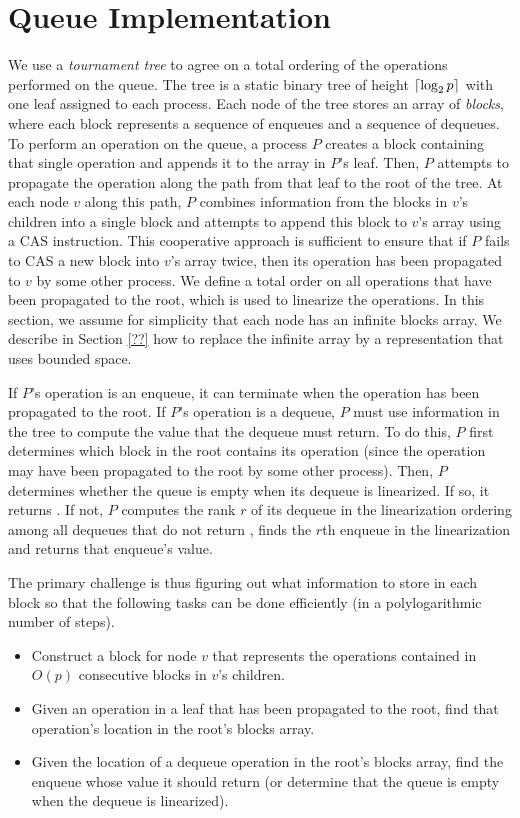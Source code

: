
\section{Queue Implementation} \label{DescriptQ}

We use a \emph{tournament tree} to agree on a total ordering of the operations performed on the queue.
The tree is a static binary tree of height $\lceil \log_2 p \rceil$ with one leaf 
assigned to each process. 
Each node of the tree stores an array of \emph{blocks}, where each block represents a 
sequence of enqueues and a sequence of dequeues.
To perform an operation on the queue, a process $P$ creates a block containing that single 
operation and appends it to the array in $P$'s leaf.
Then, $P$ attempts to propagate the operation along the path from that leaf to the root of the tree.
At each node $v$ along this path, $P$ combines information from the blocks in $v$'s children into a single
block and attempts to append this block to $v$'s array using a CAS instruction.
This cooperative approach is sufficient to ensure that if $P$ fails to CAS a new block into $v$'s array twice,
then its operation has been propagated to $v$ by some other process.
We define a total order on all operations that have been propagated to the root, which is used to
linearize the operations.
In this section, we assume for simplicity that each node has an infinite blocks array.
We describe in Section \ref{??} how to replace the infinite array by a representation that uses bounded space.

If $P$'s operation is an enqueue, it can terminate when the operation has been propagated to the root.
If $P$'s operation is a dequeue, $P$ must use information in the tree to compute the value that the
dequeue must return.  To do this, $P$ first determines which block in the root contains its operation
(since the operation may have been propagated to the root by some other process).
Then, $P$ determines whether the queue is empty when its dequeue is linearized. If so, it returns \nil.
If not, $P$ computes the rank $r$ of its dequeue in the linearization ordering
among all dequeues that do not return \nil,
finds the $r$th enqueue in the linearization and returns that enqueue's value.

The primary challenge is thus figuring out what information to store in each block so that 
the following tasks can be done efficiently (in a polylogarithmic number of steps).
\begin{itemize}
\item
Construct a block for node $v$ that represents the operations contained in $O(p)$ consecutive blocks in $v$'s children.
\item
Given an operation in a leaf that has been propagated to the root, find that operation's location in the root's blocks array.
\item
Given the location of a dequeue operation in the root's blocks array, find the enqueue whose value it should return (or determine that the queue is empty when the dequeue is linearized).
\end{itemize}

